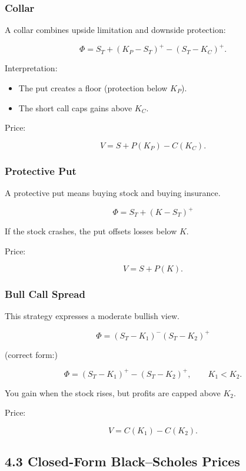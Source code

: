 \documentclass[11pt]{article}
\begin{document}
\subsubsection*{Collar}

A collar combines upside limitation and downside protection:

\[
\Phi=S_T+(K_P-S_T)^+-(S_T-K_C)^+.
\]

Interpretation:

\begin{itemize}
\item The put creates a floor (protection below $K_P$).
\item The short call caps gains above $K_C$.
\end{itemize}

Price:

\[
V=S+P(K_P)-C(K_C).
\]

\subsubsection*{Protective Put}

A protective put means buying stock and buying insurance.

\[
\Phi=S_T+(K-S_T)^+
\]

If the stock crashes, the put offsets losses below $K$.

Price:

\[
V=S+P(K).
\]

\subsubsection*{Bull Call Spread}

This strategy expresses a moderate bullish view.

\[
\Phi=(S_T-K_1)^-(S_T-K_2)^+
\]

(correct form:)

\[
\Phi=(S_T-K_1)^+-(S_T-K_2)^+, \qquad K_1<K_2.
\]

You gain when the stock rises, but profits are capped above $K_2$.

Price:

\[
V=C(K_1)-C(K_2).
\]

\subsection*{4.3 Closed-Form Black--Scholes Prices}
\end{document}
